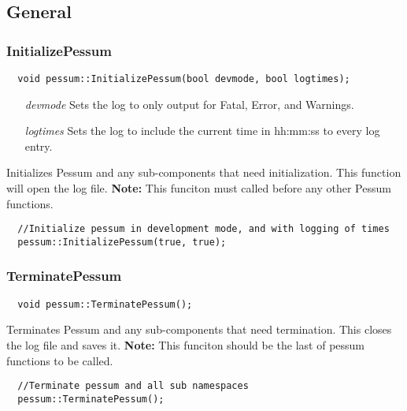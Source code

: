 \documentclass{subfiles}
\begin{document}
\subsection{General}
\newpage
\subsubsection{InitializePessum}
\begin{lstlisting}
  void pessum::InitializePessum(bool devmode, bool logtimes);
\end{lstlisting}
\begin{enumerate}
	\item[\emph{devmode}] Sets the log to only output for Fatal, Error, and Warnings.
	\item[\emph{logtimes}] Sets the log to include the current time in hh:mm:ss to every log entry.
\end{enumerate}
Initializes Pessum and any sub-components that need initialization. This function will open the log file. \textbf{Note:} This funciton must called before any other Pessum functions.
\begin{lstlisting}
  //Initialize pessum in development mode, and with logging of times
  pessum::InitializePessum(true, true);
\end{lstlisting}
\newpage
\subsubsection{TerminatePessum}
\begin{lstlisting}
  void pessum::TerminatePessum();
\end{lstlisting}
Terminates Pessum and any sub-components that need termination. This closes the log file and saves it. \textbf{Note:} This funciton should be the last of pessum functions to be called.
\begin{lstlisting}
  //Terminate pessum and all sub namespaces
  pessum::TerminatePessum();
\end{lstlisting}
\newpage
\end{document}
